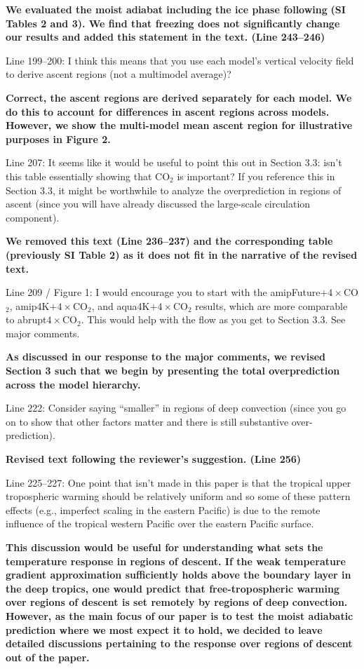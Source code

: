\documentclass[11pt]{article}
\begin{document}
\textbf{We evaluated the moist adiabat including the ice phase following} \cite{flannaghan_tropical_2014} \textbf{ (SI Tables 2 and 3). We find that freezing does not significantly change our results and added this statement in the text. (Line 243--246)}

Line 199--200: I think this means that you use each model's vertical velocity field to derive ascent regions (not a multimodel average)?

\textbf{Correct, the ascent regions are derived separately for each model. We do this to account for differences in ascent regions across models. However, we show the multi-model mean ascent region for illustrative purposes in Figure 2.}

Line 207: It seems like it would be useful to point this out in Section 3.3: isn't this table essentially showing that CO\(_2\) is important? If you reference this in Section 3.3, it might be worthwhile to analyze the overprediction in regions of ascent (since you will have already discussed the large-scale circulation component).

\textbf{We removed this text (Line 236--237) and the corresponding table (previously SI Table 2) as it does not fit in the narrative of the revised text.}

Line 209 / Figure 1: I would encourage you to start with the amipFuture\(+4\times\)CO\(_2\), amip4K\(+4\times\)CO\(_2\), and aqua4K\(+4\times\)CO\(_2\) results, which are more comparable to abrupt\(4\times\)CO\(_2\). This would help with the flow as you get to Section 3.3. See major comments.

\textbf{As discussed in our response to the major comments, we revised Section 3 such that we begin by presenting the total overprediction across the model hierarchy.}

Line 222: Consider saying ``smaller'' in regions of deep convection (since you go on to show that other factors matter and there is still substantive over-prediction).

\textbf{Revised text following the reviewer's suggestion. (Line 256)}

Line 225--227: One point that isn't made in this paper is that the tropical upper tropospheric warming should be relatively uniform and so some of these pattern effects (e.g., imperfect scaling in the eastern Pacific) is due to the remote influence of the tropical western Pacific over the eastern Pacific surface.

\textbf{This discussion would be useful for understanding what sets the temperature response in regions of descent. If the weak temperature gradient approximation sufficiently holds above the boundary layer in the deep tropics, one would predict that free-tropospheric warming over regions of descent is set remotely by regions of deep convection. However, as the main focus of our paper is to test the moist adiabatic prediction where we most expect it to hold, we decided to leave detailed discussions pertaining to the response over regions of descent out of the paper.}
\end{document}
